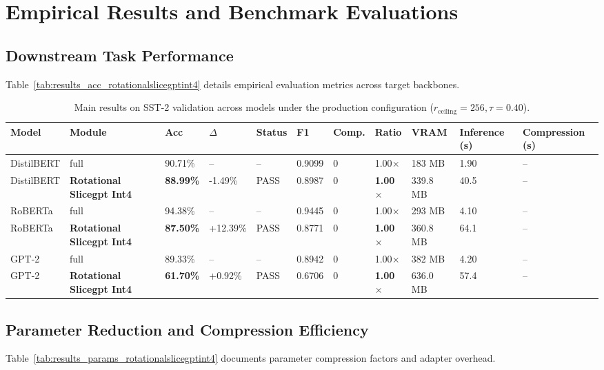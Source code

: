 \section{Empirical Results and Benchmark Evaluations}

\subsection{Downstream Task Performance}
Table~\ref{tab:results_acc_rotationalslicegptint4} details empirical evaluation metrics across target backbones.

\begin{table}[t]
\centering
\small
\begin{tabular}{lllllllllll}
\toprule
\textbf{Model} & \textbf{Module} & \textbf{Acc} & \textbf{$\Delta$} & \textbf{Status} & \textbf{F1} & \textbf{Comp.} & \textbf{Ratio} & \textbf{VRAM} & \textbf{Inference (s)} & \textbf{Compression (s)} \\
\midrule
DistilBERT & full & 90.71\% & -- & -- & 0.9099 & 0 & 1.00$\times$ & 183 MB & 1.90 & -- \\
DistilBERT & \textbf{Rotational Slicegpt Int4} & \textbf{88.99\%} & -1.49\% & PASS & 0.8987 & 0 & \textbf{1.00$\times$} & 339.8 MB & 40.5 & -- \\
RoBERTa & full & 94.38\% & -- & -- & 0.9445 & 0 & 1.00$\times$ & 293 MB & 4.10 & -- \\
RoBERTa & \textbf{Rotational Slicegpt Int4} & \textbf{87.50\%} & +12.39\% & PASS & 0.8771 & 0 & \textbf{1.00$\times$} & 360.8 MB & 64.1 & -- \\
GPT-2 & full & 89.33\% & -- & -- & 0.8942 & 0 & 1.00$\times$ & 382 MB & 4.20 & -- \\
GPT-2 & \textbf{Rotational Slicegpt Int4} & \textbf{61.70\%} & +0.92\% & PASS & 0.6706 & 0 & \textbf{1.00$\times$} & 636.0 MB & 57.4 & -- \\
\bottomrule
\end{tabular}
\caption{Main results on SST-2 validation across models under the production configuration ($r_{\mathrm{ceiling}}=256, \tau=0.40$).}
\label{tab:main_sst2}
\end{table}

\subsection{Parameter Reduction and Compression Efficiency}
Table~\ref{tab:results_params_rotationalslicegptint4} documents parameter compression factors and adapter overhead.

